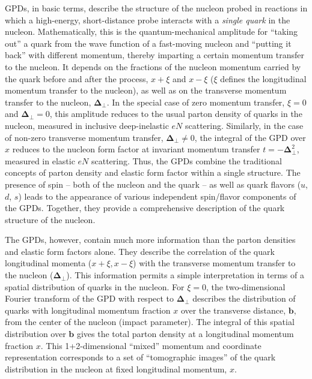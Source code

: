 GPDs, in basic terms, describe the structure of the nucleon probed in 
reactions in which a high-energy, short-distance probe interacts with a 
{\em single quark} in the nucleon.  Mathematically, this is the 
quantum-mechanical amplitude for ``taking out'' a quark from the wave 
function of a fast-moving nucleon and ``putting it back'' with different 
momentum, thereby imparting a certain momentum transfer to the nucleon.
It depends on the fractions of the nucleon momentum carried by the
quark before and after the process, $x+\xi$ and $x-\xi$ ($\xi$ defines the 
longitudinal momentum transfer to the nucleon), as well as on the transverse 
momentum transfer to the nucleon, $\bm{\Delta}_\perp$.  In the special case 
of zero momentum transfer, $\xi = 0$ and $\bm{\Delta}_\perp = 0$, this 
amplitude reduces to the usual parton density of quarks in the nucleon, 
measured in inclusive deep-inelastic $eN$ scattering.  Similarly, in the 
case of non-zero transverse momentum transfer, $\bm{\Delta}_\perp \neq 0$, 
the integral of the GPD over $x$ reduces to the nucleon form factor at 
invariant momentum transfer $t = -\bm{\Delta}_\perp^2$, measured in elastic 
$eN$ scattering. Thus, the GPDs combine the traditional concepts of parton 
density and elastic form factor within a single structure.  The presence of 
spin -- both of the nucleon and the quark -- as well as quark flavors 
($u$, $d$, $s$) leads to the appearance of various independent spin/flavor 
components of the GPDs.  Together, they provide a comprehensive description 
of the quark structure of the nucleon.

The GPDs, however, contain much more information than the parton densities 
and elastic form factors alone. They describe the correlation of the quark 
longitudinal momenta ($x+\xi, x-\xi$) with the transverse momentum transfer 
to the nucleon ($\bm{\Delta}_\perp$).  This information permits a simple 
interpretation in terms of a spatial distribution of quarks in the nucleon. 
For $\xi=0$, the two-dimensional Fourier transform of the GPD with respect to 
$\bm{\Delta}_\perp$ describes the distribution of quarks with longitudinal 
momentum fraction $x$ over the transverse distance, $\bm{b}$, from the center 
of the nucleon (impact parameter).  The integral of this spatial distribution 
over $\bm{b}$ gives the total parton density at a longitudinal momentum 
fraction $x$.  This 1+2-dimensional ``mixed'' momentum and coordinate 
representation corresponds to a set of ``tomographic images'' of the quark 
distribution in the nucleon at fixed longitudinal momentum, $x$. 


